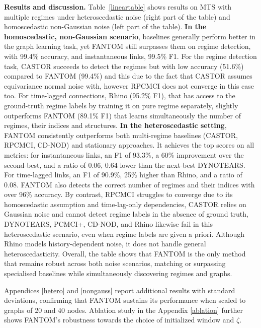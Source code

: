 \textbf{Results and discussion. }Table~\ref{lineartable} shows results on MTS with multiple regimes under heteroscedastic noise (right part of the table) and homoscedastic non-Gaussian noise (left part of the table). \textbf{In the homoscedastic, non-Gaussian scenario}, baselines generally perform better in the graph learning task, yet FANTOM still surpasses them on regime detection, with 99.4\% accuracy, and instantaneous links, 99.5\% F1. For the regime detection task, CASTOR succeeds to detect the regimes but with low accuracy (51.6\%) compared to FANTOM (99.4\%) and this due to the fact that CASTOR assumes equivariance normal noise with, however RPCMCI does not converge in this case too. For time-lagged connections, Rhino (95.2\% F1), that has access to the ground-truth regime labels by training it on pure regime separately, slightly outperforms FANTOM (89.1\% F1) that learns simultaneously the number of regimes, their indices and structures.  \textbf{In the heteroscedastic setting}, FANTOM consistently outperforms both multi-regime baselines (CASTOR, RPCMCI, CD-NOD) and stationary approaches. It achieves the top scores on all metrics: for instantaneous links, an F1 of 93.3\%, a 60\% improvement over the second-best, and a ratio of 0.06, 0.64 lower than the next-best DYNOTEARS. For time-lagged links, an F1 of 90.9\%, 25\% higher than Rhino, and a ratio of 0.08. FANTOM also detects the correct number of regimes and their indices with over 96\% accuracy. By contrast, RPCMCI struggles to converge due to its homoscedastic assumption and time-lag-only dependencies, CASTOR relies on Gaussian noise and cannot detect regime labels in the absence of ground truth, DYNOTEARS, PCMCI+, CD-NOD, and Rhino likewise fail in this heteroscedastic scenario, even when regime labels are given a priori.
Although Rhino models history-dependent noise, it does not handle general heteroscedasticity. Overall, the table shows that FANTOM is the only method that remains robust across both noise scenarios, matching or surpassing specialised baselines while simultaneously discovering regimes and graphs.

Appendices \ref{hetero} and \ref{nongauss} report additional results with standard deviations, confirming that FANTOM sustains its performance when scaled to graphs of 20 and 40 nodes. Ablation study in the Appendix \ref{ablation} further shows FANTOM's robustness towards the choice of initialized window and $\zeta$.
